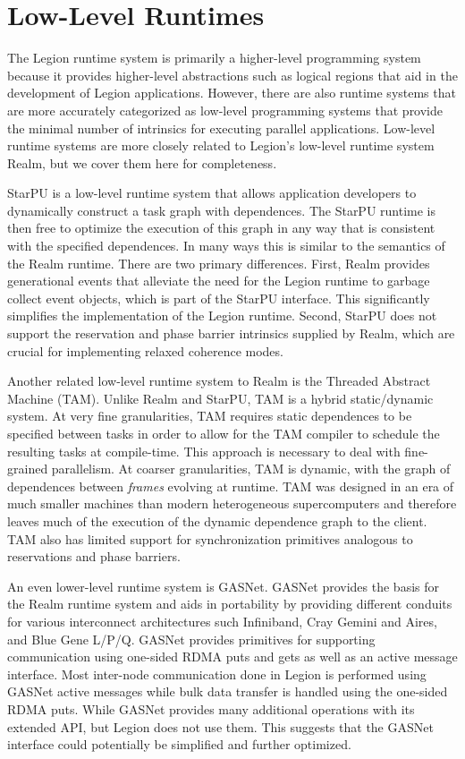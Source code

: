 \section{Low-Level Runtimes}
\label{sec:lowrts}

The Legion runtime system is primarily a higher-level
programming system because it provides higher-level
abstractions such as logical regions that aid in the 
development of Legion applications. However, there
are also runtime systems that are more accurately
categorized as low-level programming systems that 
provide the minimal number of intrinsics for 
executing parallel applications. Low-level runtime
systems are more closely related to Legion's
low-level runtime system Realm\cite{Realm14}, but
we cover them here for completeness.

StarPU is a low-level runtime system that allows
application developers to dynamically construct
a task graph with dependences\cite{StarPu11}. The 
StarPU runtime is then free to optimize the 
execution of this graph in any way that is 
consistent with the specified dependences. In many
ways this is similar to the semantics of the 
Realm runtime.  There are two primary differences.
First, Realm provides generational events that 
alleviate the need for the Legion runtime to garbage
collect event objects, which is part of the StarPU
interface. This significantly simplifies the 
implementation of the Legion runtime.  Second,
StarPU does not support the reservation and
phase barrier intrinsics supplied by Realm, which
are crucial for implementing relaxed coherence
modes.

Another related low-level runtime system to Realm is
the Threaded Abstract Machine (TAM)\cite{TAM91}.
Unlike Realm and StarPU, TAM is a hybrid static/dynamic
system. At very fine granularities, TAM requires
static dependences to be specified between tasks
in order to allow for the TAM compiler to schedule 
the resulting tasks at compile-time.  This 
approach is necessary to deal with fine-grained
parallelism. At coarser granularities, TAM is
dynamic, with the graph of dependences between
{\em frames} evolving at runtime. TAM was designed
in an era of much smaller machines than modern
heterogeneous supercomputers and therefore leaves
much of the execution of the dynamic dependence
graph to the client. TAM also has limited support
for synchronization primitives analogous to
reservations and phase barriers.

An even lower-level runtime system is GASNet\cite{GASNet02}.
GASNet provides the basis for the Realm runtime
system and aids in portability by providing different
conduits for various interconnect architectures
such Infiniband, Cray Gemini and Aires, and Blue
Gene L/P/Q. GASNet provides primitives for supporting
communication using one-sided RDMA puts and gets
as well as an active message interface. Most inter-node
communication done in Legion is performed using
GASNet active messages while bulk data transfer
is handled using the one-sided RDMA puts. While
GASNet provides many additional operations with
its extended API, but Legion does not use them. 
This suggests that the GASNet interface could 
potentially be simplified and further optimized.


